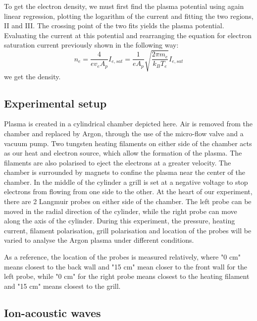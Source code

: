 To get the electron density, we must first find the plasma potential using again linear regression, plotting the logarithm of the current and fitting the two regions, II and III.
The crossing point of the two fits yields the plasma potential.
Evaluating the current at this potential and rearranging the equation for electron saturation current previously shown in the following way:
\begin{equation}
    n_e = \frac{4}{e v_e A_p} I_{e,sat} = \frac{1}{e A_p} \sqrt{\frac{2 \pi m_e}{k_B T_e}} I_{e,sat}
\end{equation}
we get the density.


\subsection{Experimental setup}
Plasma is created in a cylindrical chamber depicted here. Air is removed from the chamber and replaced by Argon, through the use of the micro-flow valve and a vacuum pump. Two tungsten heating filaments on either side of the chamber acts as our heat and electron source, which allow the formation of the plasma. The filaments are also polarised to eject the electrons at a greater velocity. The chamber is surrounded by magnets to confine the plasma near the center of the chamber.
In the middle of the cylinder a grill is set at a negative voltage to stop electrons from flowing from one side to the other.
At the heart of our experiment, there are 2 Langmuir probes on either side of the chamber. The left probe can be moved in the radial direction of the cylinder, while the right probe can move along the axis of the cylinder.
During this experiment, the pressure, heating current, filament polarisation, grill polarisation and location of the probes will be varied to analyse the Argon plasma under different conditions.

As a reference, the location of the probes is measured relatively, where "0 cm" means closest to the back wall and "15 cm" mean closer to the front wall for the left probe, while "0 cm" for the right probe means closest to the heating filament and "15 cm" means closest to the grill.



\subsection{Ion-acoustic waves}

